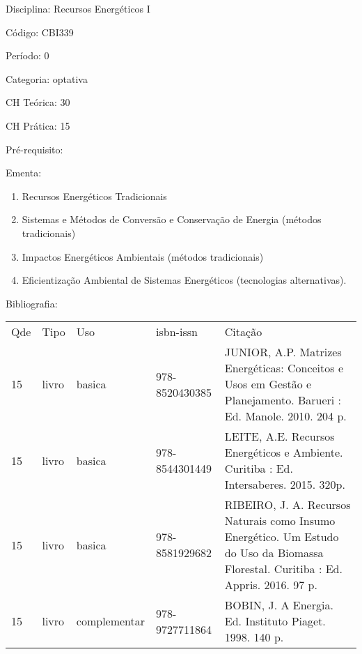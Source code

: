 \documentclass[12pt,a4paper,twoside]{report}
\begin{document}
Disciplina: Recursos Energéticos I

Código: CBI339

Período: 0

Categoria: optativa

CH Teórica: 30

CH Prática: 15




Pré-requisito:
\begin{enumerate}
\end{enumerate}

Ementa:
\begin{enumerate}
\item Recursos Energéticos Tradicionais
\item Sistemas e Métodos de Conversão e Conservação de Energia (métodos tradicionais)
\item Impactos Energéticos Ambientais (métodos tradicionais)
\item Eficientização Ambiental de Sistemas Energéticos (tecnologias alternativas).
\end{enumerate}



Bibliografia:


\begin{tabular}{llllp{8cm}}
Qde & Tipo & Uso & isbn-issn & Citação \\
15&livro&basica&978-8520430385&JUNIOR, A.P. Matrizes Energéticas: Conceitos e Usos em Gestão e Planejamento. Barueri : Ed. Manole. 2010. 204 p.\\
15&livro&basica&978-8544301449&LEITE, A.E. Recursos Energéticos e Ambiente. Curitiba : Ed. Intersaberes. 2015. 320p.\\
15&livro&basica&978-8581929682&RIBEIRO, J. A. Recursos Naturais como Insumo Energético. Um Estudo do Uso da Biomassa Florestal. Curitiba : Ed. Appris. 2016. 97 p.\\
15&livro&complementar&978-9727711864&BOBIN, J. A Energia. Ed. Instituto Piaget.  1998. 140 p.\\
\end{tabular}
\end{document}
